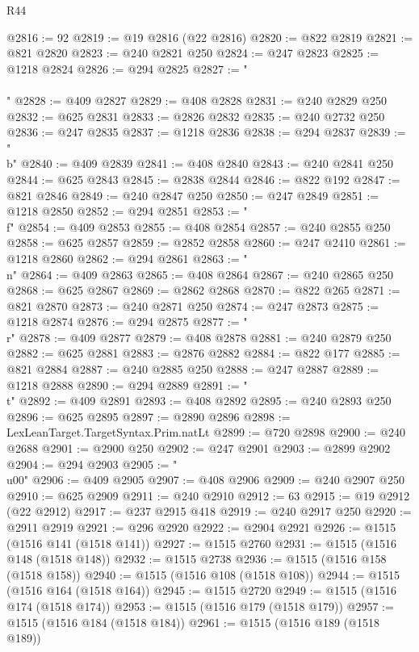 \begin{lexlean}{R44}
\begin{coremodule}
{@2816 := 92
@2819 := @19 @2816 (@22 @2816)
@2820 := @822 @2819
@2821 := @821 @2820
@2823 := @240 @2821 @250
@2824 := @247 @2823
@2825 := @1218 @2824
@2826 := @294 @2825
@2827 := "\\\\"
@2828 := @409 @2827
@2829 := @408 @2828
@2831 := @240 @2829 @250
@2832 := @625 @2831
@2833 := @2826 @2832
@2835 := @240 @2732 @250
@2836 := @247 @2835
@2837 := @1218 @2836
@2838 := @294 @2837
@2839 := "\\b"
@2840 := @409 @2839
@2841 := @408 @2840
@2843 := @240 @2841 @250
@2844 := @625 @2843
@2845 := @2838 @2844
@2846 := @822 @192
@2847 := @821 @2846
@2849 := @240 @2847 @250
@2850 := @247 @2849
@2851 := @1218 @2850
@2852 := @294 @2851
@2853 := "\\f"
@2854 := @409 @2853
@2855 := @408 @2854
@2857 := @240 @2855 @250
@2858 := @625 @2857
@2859 := @2852 @2858
@2860 := @247 @2410
@2861 := @1218 @2860
@2862 := @294 @2861
@2863 := "\\n"
@2864 := @409 @2863
@2865 := @408 @2864
@2867 := @240 @2865 @250
@2868 := @625 @2867
@2869 := @2862 @2868
@2870 := @822 @265
@2871 := @821 @2870
@2873 := @240 @2871 @250
@2874 := @247 @2873
@2875 := @1218 @2874
@2876 := @294 @2875
@2877 := "\\r"
@2878 := @409 @2877
@2879 := @408 @2878
@2881 := @240 @2879 @250
@2882 := @625 @2881
@2883 := @2876 @2882
@2884 := @822 @177
@2885 := @821 @2884
@2887 := @240 @2885 @250
@2888 := @247 @2887
@2889 := @1218 @2888
@2890 := @294 @2889
@2891 := "\\t"
@2892 := @409 @2891
@2893 := @408 @2892
@2895 := @240 @2893 @250
@2896 := @625 @2895
@2897 := @2890 @2896
@2898 := LexLeanTarget.TargetSyntax.Prim.natLt
@2899 := @720 @2898
@2900 := @240 @2688
@2901 := @2900 @250
@2902 := @247 @2901
@2903 := @2899 @2902
@2904 := @294 @2903
@2905 := "\\u00"
@2906 := @409 @2905
@2907 := @408 @2906
@2909 := @240 @2907 @250
@2910 := @625 @2909
@2911 := @240 @2910
@2912 := 63
@2915 := @19 @2912 (@22 @2912)
@2917 := @237 @2915 @418
@2919 := @240 @2917 @250
@2920 := @2911 @2919
@2921 := @296 @2920
@2922 := @2904 @2921
@2926 := @1515 (@1516 @141 (@1518 @141))
@2927 := @1515 @2760
@2931 := @1515 (@1516 @148 (@1518 @148))
@2932 := @1515 @2738
@2936 := @1515 (@1516 @158 (@1518 @158))
@2940 := @1515 (@1516 @108 (@1518 @108))
@2944 := @1515 (@1516 @164 (@1518 @164))
@2945 := @1515 @2720
@2949 := @1515 (@1516 @174 (@1518 @174))
@2953 := @1515 (@1516 @179 (@1518 @179))
@2957 := @1515 (@1516 @184 (@1518 @184))
@2961 := @1515 (@1516 @189 (@1518 @189))
}
\end{coremodule}
\end{lexlean}
